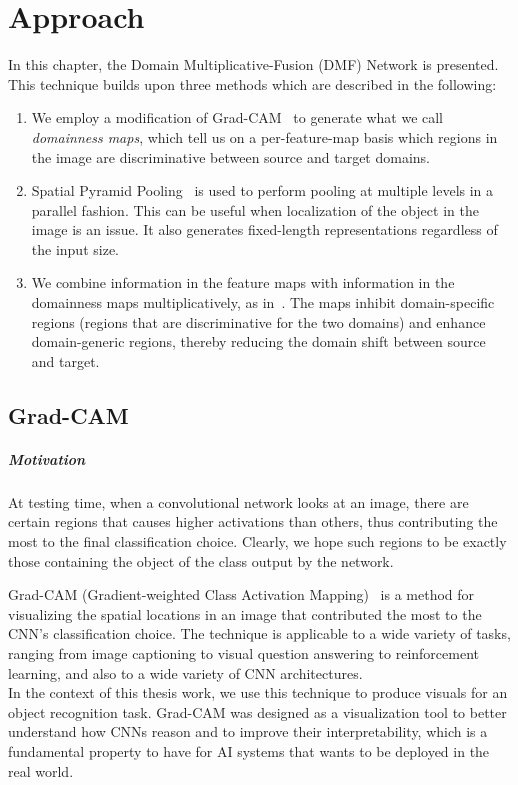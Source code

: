\documentclass[../main.tex]{subfiles}
\begin{document}
    \chapter{Approach}\label{chap:approach}

    In this chapter, the Domain Multiplicative-Fusion (DMF) Network is presented. This technique builds
    upon three methods which are described in the following:
    \begin{enumerate}
        \item We employ a modification of Grad-CAM~\cite{gradcam} to generate what we call \textit{domainness maps},
            which tell us on a per-feature-map basis which regions in the image are discriminative between
            source and target domains.
        \item Spatial Pyramid Pooling~\cite{sppooling} is used to perform pooling at multiple levels in a parallel fashion.
            This can be useful when localization of the object in the image is an issue.
            It also generates fixed-length representations regardless of the input size.
        \item We combine information in the feature maps with information in the domainness maps multiplicatively,
            as in~\cite{multfusion}. The maps inhibit domain-specific regions (regions that are discriminative for the two domains)
            and enhance domain-generic regions, thereby reducing the domain shift between source and target.
    \end{enumerate}

    \section{Grad-CAM}

    \paragraph{Motivation}

    At testing time, when a convolutional network looks at an image, there are certain regions that causes higher activations
    than others, thus contributing the most to the final classification choice. Clearly, we hope such regions to be exactly
    those containing the object of the class output by the network.

    Grad-CAM (Gradient-weighted Class Activation Mapping)~\cite{gradcam} is a method for visualizing the spatial locations
    in an image that contributed the most to the CNN's classification choice.
    The technique is applicable to a wide variety of tasks, ranging from image captioning to visual question answering to
    reinforcement learning, and also to a wide variety of CNN architectures. \\
    In the context of this thesis work, we use this technique to produce visuals for an object recognition task.
    Grad-CAM was designed as a visualization tool to better understand how CNNs reason and to improve
    their interpretability, which is a fundamental property to have for AI systems that wants to be deployed
    in the real world.
\end{document}
